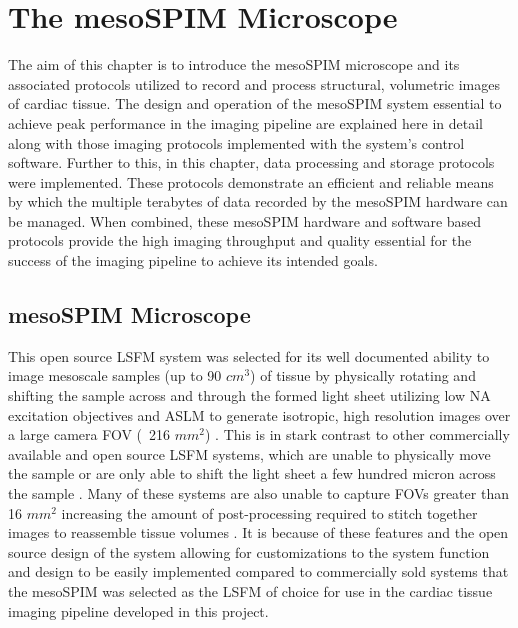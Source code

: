 \chapter{The mesoSPIM Microscope} 

The aim of this chapter is to introduce the mesoSPIM microscope and its associated protocols utilized to record and process structural, volumetric images of cardiac tissue. The design and operation of the mesoSPIM system essential to achieve peak performance in the imaging pipeline are explained here in detail along with those imaging protocols implemented with the system's control software. Further to this, in this chapter, data processing and storage protocols were implemented. These protocols demonstrate an efficient and reliable means by which the multiple terabytes of data recorded by the mesoSPIM hardware can be managed. When combined, these mesoSPIM hardware and software based protocols provide the high imaging throughput and quality essential for the success of the imaging pipeline to achieve its intended goals.

\section{mesoSPIM Microscope}

This open source LSFM system was selected for its well documented ability to image mesoscale samples (up to 90 $cm^3$) of tissue by physically rotating and shifting the sample across and through the formed light sheet utilizing low NA excitation objectives and ASLM to generate isotropic, high resolution images over a large camera FOV (~216 $mm^2$) \cite{voigt_mesospim_2019}. This is in stark contrast to other commercially available and open source LSFM systems, which are unable to physically move the sample or are only able to shift the light sheet a few hundred micron across the sample \cite{poola_light_2019}. Many of these systems are also unable to capture FOVs greater than 16 $mm^2$ increasing the amount of post-processing required to stitch together images to reassemble tissue
volumes \cite{poola_light_2019}. It is because of these features and the open source design of the system allowing for customizations to the system function and design to be easily implemented compared to commercially sold systems that the mesoSPIM was selected as the LSFM of choice for use in the cardiac tissue imaging pipeline developed in this project. 

